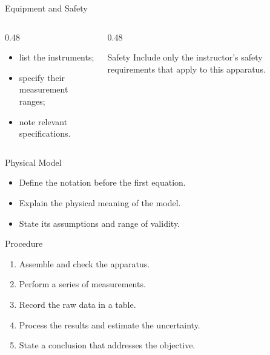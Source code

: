 \begin{frame}{Equipment and Safety}
  \begin{columns}[T,onlytextwidth]
    \begin{column}{0.48\textwidth}
      \vspace{0.6em}
      \begin{itemize}
        \item list the instruments;
        \item specify their measurement ranges;
        \item note relevant specifications.
      \end{itemize}
    \end{column}
    \begin{column}{0.48\textwidth}
      \begin{alertblock}{Safety}
        Include only the instructor's safety requirements that apply to this apparatus.
      \end{alertblock}
    \end{column}
  \end{columns}
\end{frame}

\begin{frame}{Physical Model}
  \vspace{0.8em}
  \begin{itemize}
    \item Define the notation before the first equation.
    \item Explain the physical meaning of the model.
    \item State its assumptions and range of validity.
  \end{itemize}
\end{frame}

\begin{frame}{Procedure}
  \begin{enumerate}
    \item Assemble and check the apparatus.
    \item Perform a series of measurements.
    \item Record the raw data in a table.
    \item Process the results and estimate the uncertainty.
    \item State a conclusion that addresses the objective.
  \end{enumerate}
\end{frame}


